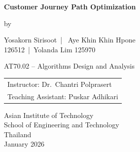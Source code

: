 \setcounter{page}{1}
\thispagestyle{empty}

\vspace*{\fill}

\begin{center}
        {\Large \bfseries Customer Journey Path Optimization}

    \vspace{9em}

    by
    \begin{center}
        Yosakorn Sirisoot \,| \, Aye Khin Khin Hpone  \\[0.5em]
    {\small   126512 \,|\, Yolanda Lim 125970 }
    \end{center}

\vfill

    \begin{center}AT70.02 -- Algorithms Design and Analysis\end{center}

    \vspace{3em}
    
    \begin{tabular}{l}
        Instructor: Dr.\ Chantri Polprasert \\
        Teaching Assistant: Puskar Adhikari
    \end{tabular}

    \vspace{9em}

    Asian Institute of Technology\\
    School of Engineering and Technology\\
    Thailand\\
    January 2026
\end{center}




\vspace*{\fill}
